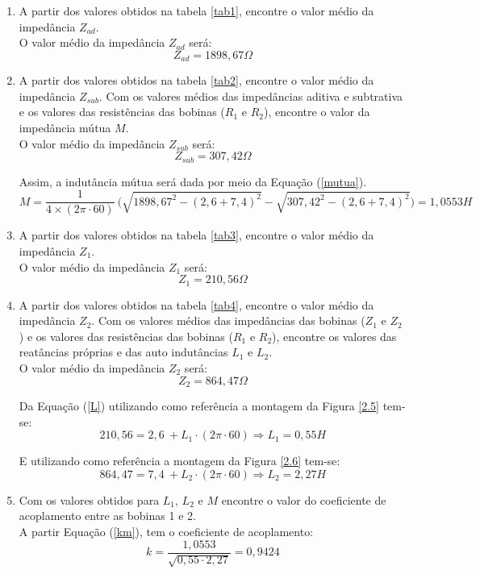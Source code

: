 \documentclass[a4paper,12pt,oneside,openany,table,xcdraw]{article}
\begin{document}
\begin{enumerate}[1 - ]
\item A partir dos valores obtidos na tabela \ref{tab1}, encontre o valor médio da impedância $Z_{ad}$.\\
O valor médio da impedância $Z_{ad}$ será:
$$Z_{ad}=1898,67\Omega$$

\item A partir dos valores obtidos na tabela \ref{tab2}, encontre o valor médio da impedância $Z_{sub}$.
Com os valores médios das impedâncias aditiva e subtrativa e os valores das resistências das
bobinas ($R_1$ e $R_2$), encontre o valor da impedância mútua $M$. \\
O valor médio da impedância $Z_{sub}$ será:
$$Z_{sub}=307,42\Omega$$

Assim, a indutância mútua será dada por meio da Equação (\ref{mutua}).
\begin{equation*}
M = \dfrac{1}{4\times(2\pi \cdot 60)}\ \bigg(\sqrt{1898,67^2-(2,6+7,4)^2} - \sqrt{307,42^2-(2,6+7,4)^2}\bigg) = 1,0553 H
\end{equation*}


\item A partir dos valores obtidos na tabela \ref{tab3}, encontre o valor médio da impedância $Z_1$.\\
O valor médio da impedância $Z_{1}$ será:
$$Z_{1}=210,56\Omega$$

\item A partir dos valores obtidos na tabela \ref{tab4}, encontre o valor médio da impedância $Z_2$.
Com os valores médios das impedâncias das bobinas ($Z_1$ e $Z_2$) e os valores das resistências
das bobinas ($R_1$ e $R_2$), encontre os valores das reatâncias próprias e das auto indutâncias $L_1$
e $L_2$.\\
O valor médio da impedância $Z_{2}$ será:
$$Z_{2}=864,47\Omega$$

Da Equação (\ref{L}) utilizando como referência a montagem da Figura \ref{2.5} tem-se:
\begin{equation*}
210,56= 2,6 \ +L_{1} \cdot(2  \pi\cdot 60) \Rightarrow L_1 = 0,55H
\end{equation*}

E utilizando como referência a montagem da Figura \ref{2.6} tem-se:
\begin{equation*}
864,47= 7,4 \ +L_{2} \cdot(2  \pi\cdot 60) \Rightarrow L_2 = 2,27H
\end{equation*}

\item Com os valores obtidos para $L_1$, $L_2$ e $M$ encontre o valor do coeficiente de acoplamento
entre as bobinas 1 e 2. \\
A partir Equação (\ref{km}), tem o coeficiente de acoplamento:
\begin{equation*}
k=\dfrac{1,0553}{\sqrt{0,55\cdot2,27}}= 0,9424
\end{equation*}


\end{enumerate}
\end{document}
